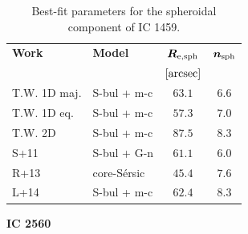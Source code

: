 \documentclass[preprint2]{emulateapj}
\begin{document}
  \begin{table}[h]
  \small
  \caption{Best-fit parameters for the spheroidal component of IC 1459.}
  \begin{center}
  \begin{tabular}{llcc}
  \hline
  {\bf Work} & {\bf Model}   & $\bm R_{\rm e,sph}$    & $\bm n_{\rm sph}$ \\
    &  &  $[\rm arcsec]$ & \\
  \hline
  T.W. 1D maj. & S-bul + m-c & $63.1$  &  $6.6$ \\
  T.W. 1D eq.  & S-bul + m-c & $57.3$  &  $7.0$ \\
  T.W. 2D      & S-bul + m-c & $87.5$  &  $8.3$ \\
  \hline
  S+11         & S-bul + G-n   & $61.1$  &  $6.0$ \\
  R+13         & core-S\'ersic & $45.4$  &  $7.6$ \\
  L+14         & S-bul + m-c   & $62.4$  &  $8.3$ \\
  \hline
  \end{tabular}
  \end{center}
  \label{tab:ic1459}
  \end{table}

  \clearpage\newpage\noindent
  {\bf IC 2560 \\}
\end{document}
